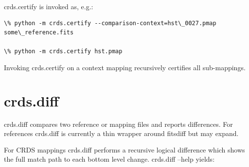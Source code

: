 \documentclass[letterpaper,10pt,english]{sphinxmanual}
\begin{document}
crds.certify is invoked as, e.g.:

\begin{Verbatim}[commandchars=\\\{\}]
\% python -m crds.certify --comparison-context=hst\_0027.pmap   some\_reference.fits

\% python -m crds.certify hst.pmap
\end{Verbatim}

Invoking crds.certify on a context mapping recursively certifies all sub-mappings.


\section{crds.diff}
\label{command_line_tools:crds-diff}
crds.diff compares two reference or mapping files and reports differences.  For
references crds.diff is currently a thin wrapper around fitsdiff but may expand.

For CRDS mappings crds.diff performs a recursive logical difference which shows
the full match path to each bottom level change.   crds.diff --help yields:
\end{document}
